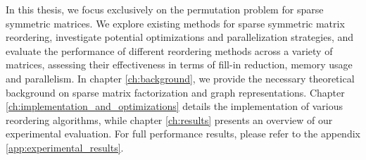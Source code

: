 In this thesis, we focus exclusively on the permutation problem for sparse symmetric matrices. We explore existing methods for sparse symmetric matrix reordering, investigate potential optimizations and parallelization strategies, and evaluate the performance of different reordering methods across a variety of matrices, assessing their effectiveness in terms of fill-in reduction, memory usage and parallelism. In chapter \ref{ch:background}, we provide the necessary theoretical background on sparse matrix factorization and graph representations. Chapter \ref{ch:implementation_and_optimizations} details the implementation of various reordering algorithms, while chapter \ref{ch:results} presents an overview of our experimental evaluation. For full performance results, please refer to the appendix \ref{app:experimental_results}.







